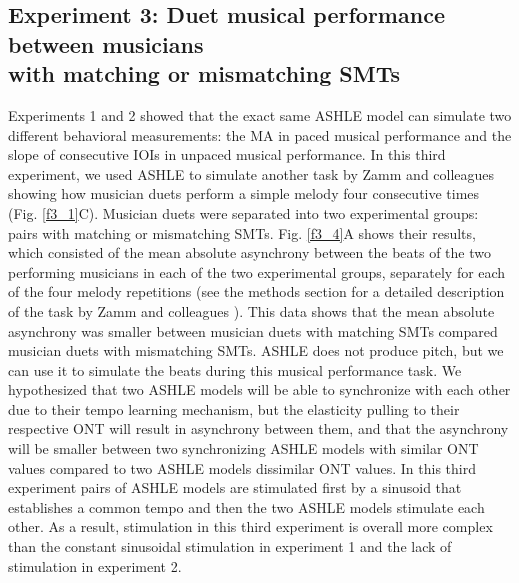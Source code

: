 \documentclass{report}
\begin{document}
\subsection{Experiment 3: Duet musical performance between musicians \\ with matching or mismatching SMTs}

Experiments 1 and 2 showed that the exact same ASHLE model can simulate two different behavioral measurements: the MA in paced musical performance and the slope of consecutive IOIs in unpaced musical performance. In this third experiment, we used ASHLE to simulate another task by Zamm and colleagues \cite{zamm2016endogenous} showing how musician duets perform a simple melody four consecutive times (Fig.{} \ref{f3_1}C). Musician duets were separated into two experimental groups: pairs with matching or mismatching SMTs. Fig.{} \ref{f3_4}A shows their results, which consisted of the mean absolute asynchrony between the beats of the two performing musicians in each of the two experimental groups, separately for each of the four melody repetitions (see the methods section for a detailed description of the task by Zamm and colleagues \cite{zamm2016endogenous}). This data shows that the mean absolute asynchrony was smaller between musician duets with matching SMTs compared musician duets with mismatching SMTs. ASHLE does not produce pitch, but we can use it to simulate the beats during this musical performance task. We hypothesized that two ASHLE models will be able to synchronize with each other due to their tempo learning mechanism, but the elasticity pulling to their respective ONT will result in asynchrony between them, and that the asynchrony will be smaller between two synchronizing ASHLE models with similar ONT values compared to two ASHLE models dissimilar ONT values. In this third experiment pairs of ASHLE models are stimulated first by a sinusoid that establishes a common tempo and then the two ASHLE models stimulate each other. As a result, stimulation in this third experiment is overall more complex than the constant sinusoidal stimulation in experiment 1 and the lack of stimulation in experiment 2.
\end{document}
